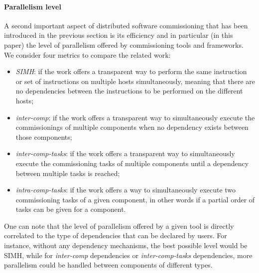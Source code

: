 \paragraph{Parallelism level}
A second important aspect of distributed software commissioning that
has been introduced in the previous section  is its efficiency and in
particular (in this paper) the level of parallelism offered by
commissioning tools and frameworks. We consider four metrics to
compare the related work:
\begin{itemize}
\item \emph{SIMH}: if the work offers a transparent way to perform the
  same instruction or set of instructions on multiple hosts
  simultaneously, meaning that there are no dependencies between the
  instructions to be performed on the different hosts;
  \item \emph{inter-comp}: if the work offers a transparent way to
    simultaneously execute the commissionings of multiple components
    when no dependency exists between those components;
  \item \emph{inter-comp-tasks}: if the work offers a transparent way to
    simultaneously execute the commissioning tasks of multiple
    components until a dependency between multiple tasks is reached;
  \item \emph{intra-comp-tasks}: if the work offers a way to simultaneously
    execute two commissioning tasks of a given component, in other
    words if a partial order of tasks can be given for a component.
\end{itemize}
One can note that the level of parallelism offered by a given tool is
directly correlated to the type of dependencies that can be declared
by users. For instance, without any dependency mechanisms, the best
possible level would be SIMH, while for \emph{inter-comp} dependencies
or \emph{inter-comp-tasks} dependencies, more parallelism could be
handled between components of different types.


